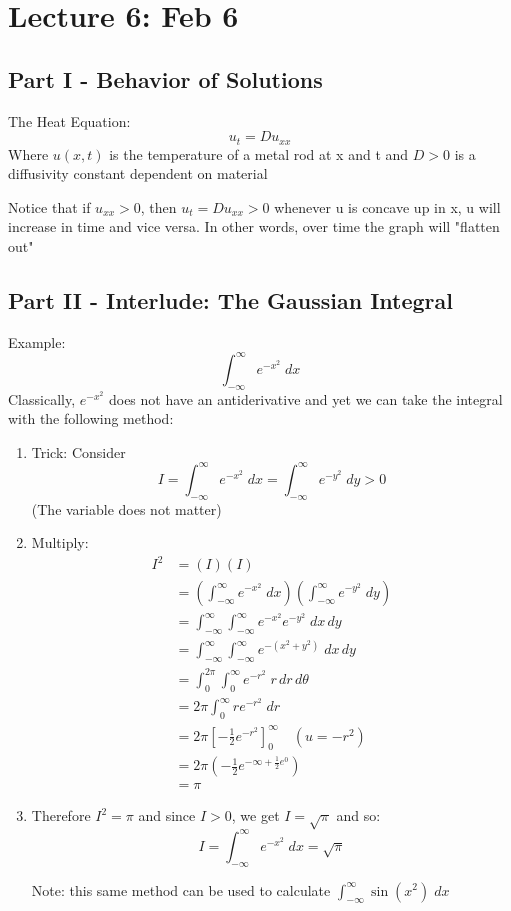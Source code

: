 \documentclass[12pt]{article}
\begin{document}
\section{Lecture 6: Feb 6}
\subsection*{Part I - Behavior of Solutions}
The Heat Equation:
\[u_t = Du_{xx}\]
Where $u(x, t)$ is the temperature of a metal rod at x and t and $D > 0$ is a diffusivity constant dependent on material

Notice that if $u_{xx} > 0$, then $u_t = Du_{xx} > 0$ whenever u is concave up in x, u will increase in time and vice versa. In other words, over time the graph will "flatten out"

\subsection*{Part II - Interlude: The Gaussian Integral}
Example: \[\int_{-\infty}^\infty e^{-x^2}\; dx\]
Classically, $e^{-x^2}$ does not have an antiderivative and yet we can take the integral with the following method:
\begin{enumerate}
    \item Trick: Consider 
    \[I = \int_{-\infty}^\infty e^{-x^2} \; dx = \int_{-\infty}^\infty e^{-y^2} \; dy > 0 \]
    (The variable does not matter)
    \item Multiply:
    \begin{align*}
        I^2 &= (I)(I)\\
        &= \left(\int_{-\infty}^\infty e^{-x^2} \; dx\right)\left(\int_{-\infty}^\infty e^{-y^2} \; dy\right)\\
        &= \int_{-\infty}^\infty \int_{-\infty}^\infty e^{-x^2} e^{-y^2} \; dx\, dy\\
        &= \int_{-\infty}^\infty \int_{-\infty}^\infty e^{-(x^2 +y^2)} \; dx\, dy\\
        &= \int_0^{2\pi} \int_0^\infty e^{-r^2} \; r\, dr\, d\theta\\
        &= 2\pi \int_0^\infty re^{-r^2} \; dr\\
        &= 2\pi \left[-\frac{1}{2}e^{-r^2}\right]_0^\infty \quad (u = -r^2)\\
        &= 2\pi \left(-\frac{1}{2}e^{-\infty + \frac{1}{2}e^0}\right)\\
        &= \pi        
    \end{align*}
    \item Therefore $I^2 = \pi$ and since $I > 0$, we get $I = \sqrt{\pi}$ and so:
    \[I = \int_{-\infty}^\infty e^{-x^2} \; dx =\sqrt{\pi}\]

    Note: this same method can be used to calculate $\int_{-\infty}^\infty \sin(x^2)\; dx$
\end{enumerate}
\end{document}
